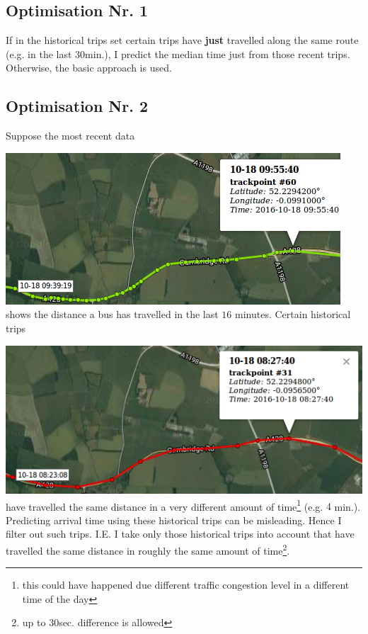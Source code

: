 \documentclass[12pt,a4paper,oneside,openright]{report}
\begin{document}
\subsection{Optimisation Nr. 1}

If in the historical trips set certain trips have \textbf{just} travelled along
the same route (e.g. in the last $30$min.), I predict the median time just from
those recent trips. Otherwise, the basic approach is used.

\subsection{Optimisation Nr. 2}

Suppose the most recent data

\includegraphics[scale = 0.7]{figs/recent_trip.png} \\

shows the distance a bus has travelled in the last $16$ minutes. Certain historical
trips

\includegraphics[scale = 0.7]{figs/inaccurate_historical.png} \\

have travelled the same distance in a very different amount of 
time\footnote{this could have happened due different traffic congestion level
in a different time of the day} (e.g. $4$ min.). Predicting arrival time using
these historical trips can be misleading. Hence I filter out such trips.
I.E. I take only those historical trips into account that have travelled the same
distance in roughly the same amount of time\footnote{up to 30sec. difference
is allowed}. \\
\end{document}
